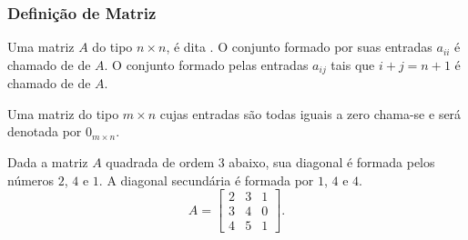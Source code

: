 
\begin{frame}
    \frametitle{Definição de Matriz}

    \begin{definicao}
        Uma matriz $A$ do tipo $n \times n$, é dita . O conjunto formado por suas entradas $a_{ii}$ é chamado de  de $A$. O conjunto formado pelas entradas $a_{ij}$ tais que $i+j = n+1$ é chamado de  de $A$.
        
        Uma matriz do tipo $m \times n$ cujas entradas são todas iguais a zero chama-se  e será denotada por $0_{m \times n}$.
    \end{definicao} \pause

    \begin{exemplo}
        Dada a matriz $A$ quadrada de ordem $3$ abaixo, sua diagonal é formada pelos números $2$, $4$ e $1$. A diagonal secundária é formada por $1$, $4$ e $4$. 
        \begin{displaymath} A = 
            \begin{bmatrix}
                2 & 3 & 1\\
                3 & 4 & 0\\
                4 & 5 & 1
            \end{bmatrix}.
        \end{displaymath}
    \end{exemplo}
\end{frame}